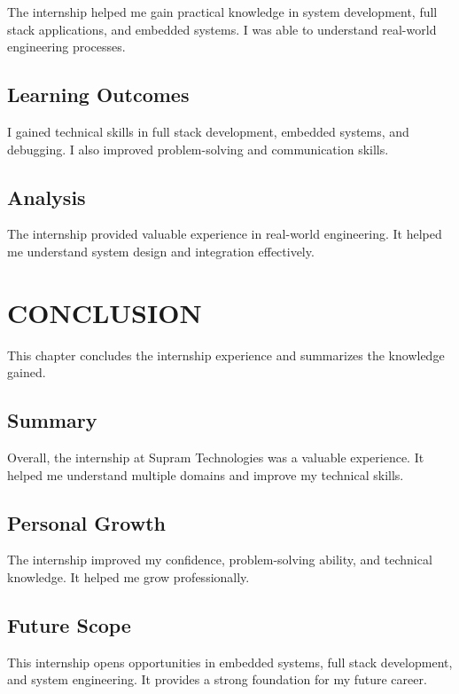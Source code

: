 \documentclass[12pt,a4paper]{report}
\begin{document}
The internship helped me gain practical knowledge in system development, full stack applications, and embedded systems. I was able to understand real-world engineering processes.


\section{Learning Outcomes}

I gained technical skills in full stack development, embedded systems, and debugging. I also improved problem-solving and communication skills.


\section{Analysis}

The internship provided valuable experience in real-world engineering. It helped me understand system design and integration effectively.




\chapter{CONCLUSION}
\label{ch:conclusion}


This chapter concludes the internship experience and summarizes the knowledge gained.




\section{Summary}

Overall, the internship at Supram Technologies was a valuable experience. It helped me understand multiple domains and improve my technical skills.


\section{Personal Growth}

The internship improved my confidence, problem-solving ability, and technical knowledge. It helped me grow professionally.


\section{Future Scope}

This internship opens opportunities in embedded systems, full stack development, and system engineering. It provides a strong foundation for my future career.
\end{document}
